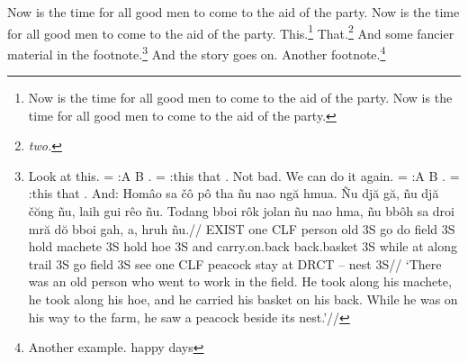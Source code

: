 
\donotestrue
\let\footnotesize=\tenrm

\ininotes

Now is the time for all good men to come to the aid
of the party.  Now is the time for all good men to come to the aid
of the party.
This.\footnote{%
Now is the time for all good men to come to the aid
of the party.  Now is the time for all good men to come to the aid
of the party.%
}
That.\footnote{%
\it two.%
}
And some fancier
material in the footnote.\footnote{%
Look at this.
\pex[sampleexno=(ii)]
\a \jtree \! = :{A} {B} .\endjtree
\a \jtree \! = :{this} {that} .\endjtree
\xe
Not bad.  We can do it again.
\pex
\a \jtree \! = :{A} {B} .\endjtree
\a \jtree \! = :{this} {that} .\endjtree
\xe
And:
\pex[glftpos=right,glhangstyle=none,everypanel=\footnotesize,nopreamble]
\let\\=\uppercase
\a
\begingl
\gla
Hom\^{a}o sa \v{c}\^{o} p\^{o} tha  \~{n}u nao ng\u{a} hmua. \~{N}u
dj\u{a} g\u{a}, \~{n}u dj\u{a} \v{c}\u{o}ng \~{n}u, laih gui r\^{e}o
\~{n}u. Todang bboi r\^{o}k jolan \~{n}u nao hma, \~{n}u bb\^{o}h sa
droi mr\u{a} d\u{o} bboi gah, a, hruh \~{n}u.//
\glb
\\{exist} one \\{clf} person old \\{3s} go do field \\{3s} hold
machete \\{3s} hold hoe \\{3s} and carry.on.back back.basket \\{3s}
while at along trail \\{3s} go field \\{3s} see one \\{clf} peacock
stay at \\{drct} -- nest \\{3s}//
\glft
`There was an old person who went to work in the field. He took
along his machete, he took along his hoe, and he carried his
basket on his back. While he was on his way to the farm, he saw a
peacock beside its nest.'//
\endgl
\a
\xe
}
And the story goes on.  Another footnote.\footnote{%
Another example.
\ex happy days\xe
}
